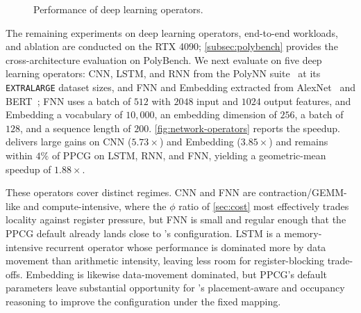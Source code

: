 \begin{figure}
\caption{Performance of deep learning operators.}
\label{fig:network-operators}
\end{figure}

The remaining experiments on deep learning operators, end-to-end workloads, and ablation are conducted on the RTX 4090; \autoref{subsec:polybench} provides the cross-architecture evaluation on PolyBench. We next evaluate \name on five deep learning operators: CNN, LSTM, and RNN from the PolyNN suite~\cite{polynn} at its \texttt{EXTRALARGE} dataset sizes, and FNN and Embedding extracted from AlexNet~\cite{alexnet} and BERT~\cite{bert}; FNN uses a batch of \(512\) with \(2048\) input and \(1024\) output features, and Embedding a vocabulary of \(10{,}000\), an embedding dimension of \(256\), a batch of \(128\), and a sequence length of \(200\). \autoref{fig:network-operators} reports the speedup. \name delivers large gains on CNN (\(5.73\times\)) and Embedding (\(3.85\times\)) and remains within \(4\%\) of PPCG on LSTM, RNN, and FNN, yielding a geometric-mean speedup of \(1.88\times\).

These operators cover distinct regimes. CNN and FNN are contraction/GEMM-like and compute-intensive, where the \(\phi\) ratio of \autoref{sec:cost} most effectively trades locality against register pressure, but FNN is small and regular enough that the PPCG default already lands close to \name's configuration. LSTM is a memory-intensive recurrent operator whose performance is dominated more by data movement than arithmetic intensity, leaving less room for register-blocking trade-offs. Embedding is likewise data-movement dominated, but PPCG's default parameters leave substantial opportunity for \name's placement-aware and occupancy reasoning to improve the configuration under the fixed mapping.

